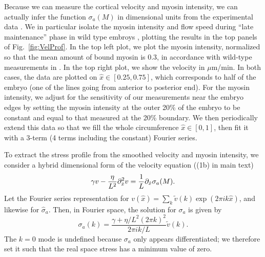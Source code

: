 \documentclass[11pt]{article}
\newcommand{\6}[1]{#1_{\text{6}}}
\newcommand{\3}[1]{#1_{\text{3}}}
\begin{document}
Because we can measure the cortical velocity and myosin intensity, we can actually infer the function $\sigma_a(M)$ in dimensional units from the experimental data \cite{sailer2015dynamic}. We in particular isolate the myosin intensity and flow speed during ``late maintenance'' phase in wild type embroys \cite[Fig.~1B(bottom)]{sailer2015dynamic}, plotting the results in the top panels of Fig.\ \ref{fig:VelProf}. In the top left plot, we plot the myosin intensity, normalized so that the mean amount of bound myosin is 0.3, in accordance with wild-type measurements in \cite[Fig.~S3]{gross2019guiding}. In the top right plot, we show the velocity in $\mu$m/min. In both cases, the data are plotted on $\hat x \in [0.25,0.75]$, which corresponds to half of the embryo (one of the lines going from anterior to posterior end). For the myosin intensity, we adjust for the sensitivity of our measurements near the embryo edges by setting the myosin intensity at the outer 20\% of the embryo to be constant and equal to that measured at the 20\% boundary. We then periodically extend this data so that we fill the whole circumference $\hat x \in [0,1]$, then fit it with a 3-term (4 terms including the constant) Fourier series. 

To extract the stress profile from the smoothed velocity and myosin intensity, we consider a hybrid dimensional form of the velocity equation ((1b) in main text)
\begin{equation*}
\gamma v -\frac{ \eta}{L^2} \partial_{\hat{x}}^2 v = \frac{1}{L} \partial_{\hat{x}}  \sigma_a(M). 
\end{equation*}
Let the Fourier series representation for $v(\hat x)= \sum_k \tilde v(k) \exp{\left(2 \pi i k \hat x \right)}$, and likewise for $\hat \sigma_a$. Then, in Fourier space, the solution for $\sigma_a$ is given by 
\begin{equation}
\label{eq:SigmaAF}
\sigma_a(k) = \frac{\gamma+ \eta/L^2 \left(2 \pi k\right)^2}{2 \pi i k/L} \tilde v(k). 
\end{equation}
The $k=0$ mode is undefined because $\sigma_a$ only appears differentiated; we therefore set it such that the real space stress has a minimum value of zero. 
\end{document}
